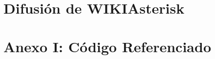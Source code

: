 \documentclass[a4paper,11pt]{book}
\begin{document}
\chapter{Difusión de WIKIAsterisk}\label{cap:difusion}


\chapter{Anexo I: Código Referenciado}




\nocite{atdg11}
\nocite{website:voipinfo}
\nocite{website:asterisk}
\nocite{win09}
\nocite{cookbook11}
\nocite{website:curl}
\nocite{website:telefonica}


\end{document}

